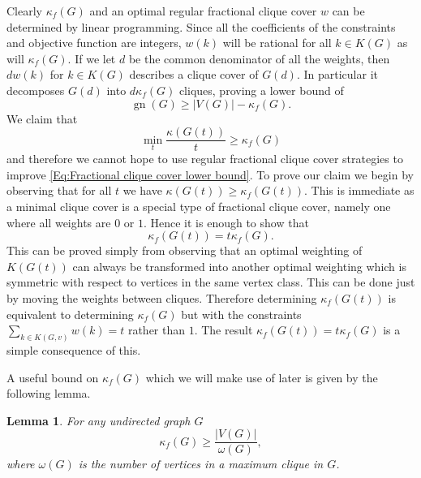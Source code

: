 \documentclass[a4paper, 14pt]{extarticle}
\theoremstyle{plain}
\newtheorem{lemma}[proposition]{Lemma}
\DeclareMathOperator{\gn}{gn}
\begin{document}
Clearly $\kappa_f(G)$ and an optimal regular fractional clique cover $w$ can be determined
by linear programming. Since all the coefficients of the constraints
and objective function are integers, $w(k)$ will be rational for all
$k\in K(G)$ as will $\kappa_f(G)$. If we let $d$ be the common
denominator of all the weights, then $dw(k)$ for $k\in K(G)$
describes a clique cover of $G(d)$. In particular it decomposes
$G(d)$ into $d\kappa_f(G)$ cliques, proving a lower bound of
\begin{equation}\label{Eq:Fractional clique cover lower bound}
\gn(G) \geq |V(G)|-\kappa_f(G).
\end{equation}
We claim that
\[\min_t \frac{\kappa(G(t))}{t} \geq\kappa_f(G)\]
and therefore we cannot hope to use regular fractional clique cover strategies to improve \eqref{Eq:Fractional clique cover lower bound}.
 To prove our claim we begin by observing that for all $t$ we have $\kappa(G(t))\geq \kappa_f(G(t))$. This is immediate as a minimal clique cover is a special type of fractional clique cover, namely one where all weights are $0$ or $1$. Hence it is enough to show that
\[\kappa_f(G(t))=t\kappa_f(G).\]
%
%
%
%
This can be proved simply from observing that an optimal weighting of $K(G(t))$ can always be transformed into another optimal weighting which is symmetric with respect to vertices in the same vertex class. This can be done just by moving the weights between cliques. Therefore determining $\kappa_f(G(t))$
is equivalent to determining $\kappa_f(G)$ but with the constraints
$\sum_{k\in K(G,v)}w(k)=t$ rather than $1$. The result
$\kappa_f(G(t))=t\kappa_f(G)$ is a simple consequence of this.

A useful bound on $\kappa_f(G)$ which we will make use of later is
given by the following lemma.

\begin{lemma}\label{Lem:BoundOnFractionalClique}
For any undirected graph $G$
\[
\kappa_f(G)\geq \frac{|V(G)|}{\omega(G)},
\]
where $\omega(G)$ is the number of vertices in a maximum clique in
$G$.
\end{lemma}
\end{document}
